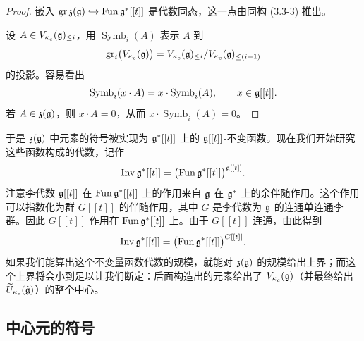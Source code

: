 \begin{proof}
    嵌入 $\operatorname{gr}\mathfrak z(\mathfrak{g})\hookrightarrow\operatorname{Fun}\mathfrak{g}^*[[t]]$ 是代数同态，这一点由同构 (3.3-3) 推出。

    设 $A\in V_{\kappa_c}(\mathfrak{g})_{\le i}$，用 $\operatorname{Symb}_i(A)$ 表示 $A$ 到
    \[
        \operatorname{gr}_i\bigl(V_{\kappa_c}(\mathfrak{g})\bigr)
        = V_{\kappa_c}(\mathfrak{g})_{\le i}/V_{\kappa_c}(\mathfrak{g})_{\le(i-1)}
    \]
    的投影。容易看出
    \[
        \operatorname{Symb}_i(x\cdot A) = x\cdot\operatorname{Symb}_i(A),
        \qquad x\in\mathfrak{g}[[t]].
    \]
    若 $A\in\mathfrak z(\mathfrak{g})$，则 $x\cdot A=0$，从而 $x\cdot\operatorname{Symb}_i(A)=0$。
\end{proof}


于是 $\mathfrak z(\mathfrak{g})$ 中元素的符号被实现为 $\mathfrak{g}^*[[t]]$ 上的 $\mathfrak{g}[[t]]$-不变函数。现在我们开始研究这些函数构成的代数，记作
\[
    \operatorname{Inv}\mathfrak{g}^*[[t]] = \bigl(\operatorname{Fun}\mathfrak{g}^*[[t]]\bigr)^{\mathfrak{g}[[t]]}.
\]
注意李代数 $\mathfrak{g}[[t]]$ 在 $\operatorname{Fun}\mathfrak{g}^*[[t]]$ 上的作用来自 $\mathfrak{g}$ 在 $\mathfrak{g}^*$ 上的余伴随作用。这个作用可以指数化为群 $G[[t]]$ 的伴随作用，其中 $G$ 是李代数为 $\mathfrak{g}$ 的连通单连通李群。因此 $G[[t]]$ 作用在 $\operatorname{Fun}\mathfrak{g}^*[[t]]$ 上。由于 $G[[t]]$ 连通，由此得到
\[
    \operatorname{Inv}\mathfrak{g}^*[[t]] = \bigl(\operatorname{Fun}\mathfrak{g}^*[[t]]\bigr)^{G[[t]]}.
\]
如果我们能算出这个不变量函数代数的规模，就能对 $\mathfrak z(\mathfrak{g})$ 的规模给出上界；而这个上界将会小到足以让我们断定：后面构造出的元素给出了 $V_{\kappa_c}(\mathfrak{g})$（并最终给出 $\widetilde U_{\kappa_c}(\hat{\mathfrak{g}})$）的整个中心。


\subsection{中心元的符号}

